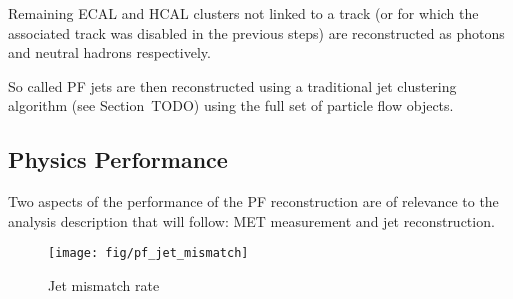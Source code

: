 Remaining \ac{ECAL} and \ac{HCAL} clusters not linked to a track (or for which
the associated track was disabled in the previous steps) are reconstructed as
photons and neutral hadrons respectively.

So called \ac{PF} jets are then reconstructed using a traditional jet clustering
algorithm (see Section~TODO) using the full set of particle flow objects.

\subsection{Physics Performance}
Two aspects of the performance of the \ac{PF} reconstruction are of relevance to
the analysis description that will follow: \acl{MET} measurement and jet
reconstruction.

\begin{figure}
\texttt{[image: fig/pf\_jet\_mismatch]}
\caption{Jet mismatch rate \cite{berger_left_handed_w}}
\label{fig:pf_jet_mismatch}
\end{figure}

